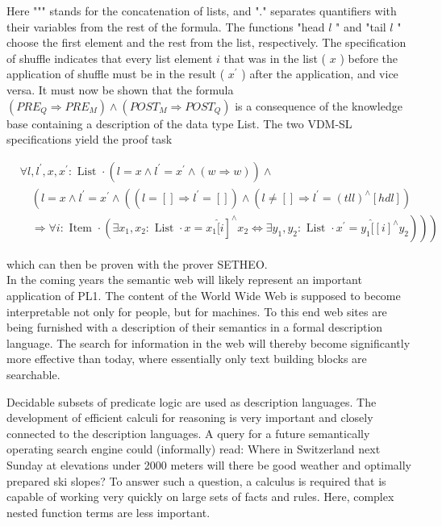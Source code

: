 \documentclass[10pt]{article}
\begin{document}
Here """ stands for the concatenation of lists, and "." separates quantifiers with their variables from the rest of the formula. The functions "head $l$ " and "tail $l$ " choose the first element and the rest from the list, respectively. The specification of shuffle indicates that every list element $i$ that was in the list ( $x$ ) before the application of shuffle must be in the result ( $x^{\prime}$ ) after the application, and vice versa. It must now be shown that the formula $\left(P R E_{Q} \Rightarrow P R E_{M}\right) \wedge\left(P O S T_{M} \Rightarrow P O S T_{Q}\right)$ is a consequence of the knowledge base containing a description of the data type List. The two VDM-SL specifications yield the proof task

$$
\begin{aligned}
& \forall l, l^{\prime}, x, x^{\prime}: \text { List } \cdot\left(l=x \wedge l^{\prime}=x^{\prime} \wedge(w \Rightarrow w)\right) \wedge \\
& \quad\left(l=x \wedge l^{\prime}=x^{\prime} \wedge\left(\left(l=[] \Rightarrow l^{\prime}=[]\right) \wedge\left(l \neq[] \Rightarrow l^{\prime}=(t l l)^{\wedge}[h d l]\right)\right.\right. \\
& \left.\left.\left.\quad \Rightarrow \forall i: \text { Item } \cdot\left(\exists x_{1}, x_{2}: \text { List } \cdot x=x_{1} \hat{[ } i\right]^{\wedge} x_{2} \Leftrightarrow \exists y_{1}, y_{2}: \text { List } \cdot x^{\prime}=y_{1} \hat{[ }[i]^{\wedge} y_{2}\right)\right)\right)
\end{aligned}
$$

which can then be proven with the prover SETHEO.\\
In the coming years the semantic web will likely represent an important application of PL1. The content of the World Wide Web is supposed to become interpretable not only for people, but for machines. To this end web sites are being furnished with a description of their semantics in a formal description language. The search for information in the web will thereby become significantly more effective than today, where essentially only text building blocks are searchable.

Decidable subsets of predicate logic are used as description languages. The development of efficient calculi for reasoning is very important and closely connected to the description languages. A query for a future semantically operating search engine could (informally) read: Where in Switzerland next Sunday at elevations under 2000 meters will there be good weather and optimally prepared ski slopes? To answer such a question, a calculus is required that is capable of working very quickly on large sets of facts and rules. Here, complex nested function terms are less important.
\end{document}
